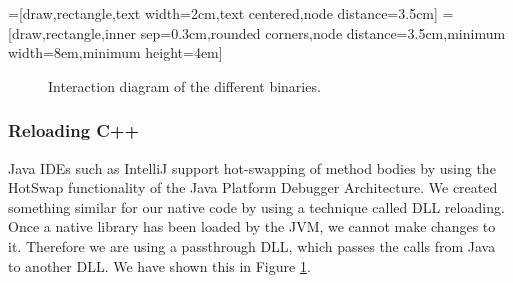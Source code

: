 \documentclass[]{article}
\begin{document}
=[draw,rectangle,text width=2cm,text centered,node distance=3.5cm]
=[draw,rectangle,inner sep=0.3cm,rounded corners,node distance=3.5cm,minimum width=8em,minimum height=4em]
\begin{figure}
  \centering
  \caption[Binary interaction]{Interaction diagram of the different binaries.}
  \label{fig:modules}
\end{figure}

\subsubsection{Reloading C++}
Java IDEs such as IntelliJ support hot-swapping of method bodies by using the HotSwap functionality of the Java Platform Debugger Architecture.
We created something similar for our native code by using a technique called DLL reloading.
Once a native library has been loaded by the JVM, we cannot make changes to it.
Therefore we are using a passthrough DLL, which passes the calls from Java to another DLL.
We have shown this in Figure \ref{fig:modules}.
\end{document}
